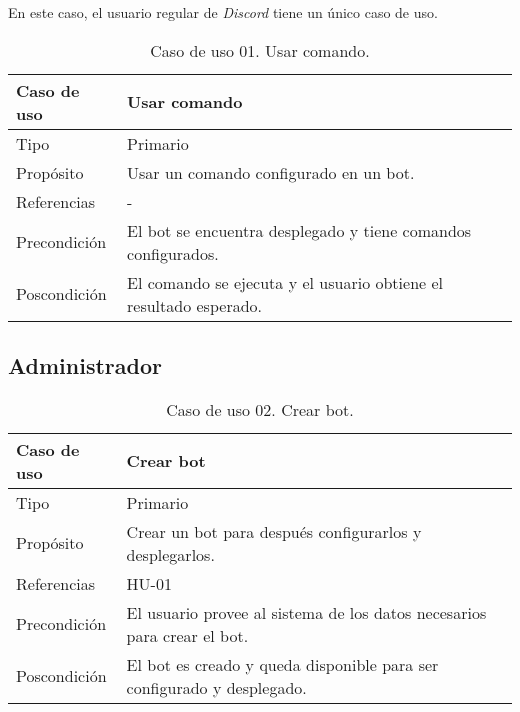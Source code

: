 En este caso, el usuario regular de \textit{Discord} tiene un único caso de uso.

\begin{table}[H]
    \centering
    \def\arraystretch{1.25}
    \begin{adjustbox}{max width=\textwidth}
    \begin{tabularx}{\textwidth}{l|L}
    \hline
        \textbf{Caso de uso} & \textbf{Usar comando} \\ \hline
    \hline
        Tipo & Primario \\ \hline
        Propósito & Usar un comando configurado en un bot. \\ \hline
        Referencias & - \\ \hline
        Precondición & El bot se encuentra desplegado y tiene comandos configurados. \\ \hline
        Poscondición & El comando se ejecuta y el usuario obtiene el resultado esperado. \\ \hline
    \end{tabularx}
    \end{adjustbox}
    \caption{Caso de uso 01. Usar comando.}
\end{table}


\subsection{Administrador}

\begin{table}[H]
    \centering
    \def\arraystretch{1.25}
    \begin{adjustbox}{max width=\textwidth}
    \begin{tabularx}{\textwidth}{l|L}
    \hline
        \textbf{Caso de uso} & \textbf{Crear bot} \\ \hline
    \hline
        Tipo & Primario \\ \hline
        Propósito & Crear un bot para después configurarlos y desplegarlos. \\ \hline
        Referencias & HU-01 \\ \hline
        Precondición & El usuario provee al sistema de los datos necesarios para crear el bot. \\ \hline
        Poscondición & El bot es creado y queda disponible para ser configurado y desplegado. \\ \hline
    \end{tabularx}
    \end{adjustbox}
    \caption{Caso de uso 02. Crear bot.}
\end{table}

